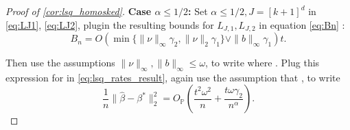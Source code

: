 \documentclass[ejs,noshowframe]{imsart}
\theoremstyle{plain}
\theoremstyle{definition}
\renewcommand{\P}{\mathbb{P}}
\newcommand{\snorm}[1]{\lVert #1 \rVert}
\renewcommand{\hat}{\widehat}
\begin{document}
\begin{appendix}
\begin{proof}[Proof of \autoref{cor:lsq_homosked}]
\textbf{Case $\alpha \leq 1/2$:}
	Set $\alpha \leq 1/2, J = [k+1]^d$ in \eqref{eq:LJ1}, \eqref{eq:LJ2},
	plugin the resulting bounds for $L_{J,1}, L_{J,2}$ in equation \eqref{eq:Bn} :
	\begin{equation}
		\label{eq:B_with_L_substituted}
		B_n =  O(\min\{\|\nu\|_\infty \gamma_2, \| \nu\|_2 \gamma_1 \} \vee 
		\|b\|_\infty \gamma_1) t.
	\end{equation}
	
	Then use 
	the assumptions 
	$\| \nu \|_\infty, \| b \|_\infty \leq \omega$,
	to write
where .
Plug this expression for  in \eqref{eq:lsq_rates_result}, again 
use the 
assumption that , to write
	\begin{equation}
	\frac{1}{n}\snorm{ \hat\beta - \beta^* }_2^2 
	= O_{\P} \left( \frac{t^2 \omega^2}{n}
			+ \frac{t \omega \gamma_2}{n^\alpha}   \right).
\end{equation}
	

\end{proof}
\end{appendix}
\end{document}
